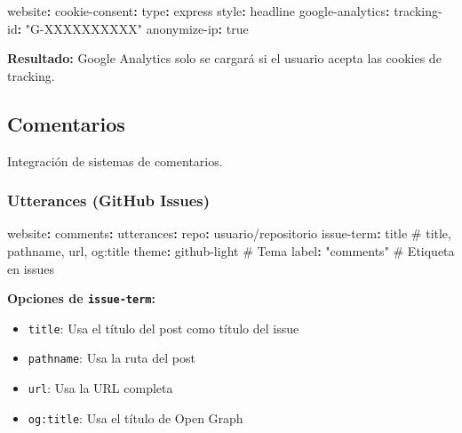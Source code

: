 \documentclass[
  doc,
  floatsintext,
  longtable,
  a4paper,
  nolmodern,
  notxfonts,
  notimes,
  12pt,
  colorlinks=true,linkcolor=blue,citecolor=blue,urlcolor=blue]{apa7}
\newenvironment{Shaded}{\begin{snugshade}}{\end{snugshade}}
\newcommand{\AttributeTok}[1]{\textcolor[rgb]{0.40,0.45,0.13}{#1}}
\newcommand{\CharTok}[1]{\textcolor[rgb]{0.13,0.47,0.30}{#1}}
\newcommand{\CommentTok}[1]{\textcolor[rgb]{0.37,0.37,0.37}{#1}}
\newcommand{\FunctionTok}[1]{\textcolor[rgb]{0.28,0.35,0.67}{#1}}
\newcommand{\KeywordTok}[1]{\textcolor[rgb]{0.00,0.23,0.31}{\textbf{#1}}}
\newcommand{\StringTok}[1]{\textcolor[rgb]{0.13,0.47,0.30}{#1}}
\providecommand{\tightlist}{%
  \setlength{\itemsep}{0pt}\setlength{\parskip}{0pt}}
\begin{document}
\begin{Shaded}
\begin{Highlighting}[]
\FunctionTok{website}\KeywordTok{:}
\AttributeTok{  }\FunctionTok{cookie{-}consent}\KeywordTok{:}
\AttributeTok{    }\FunctionTok{type}\KeywordTok{:}\AttributeTok{ express}
\AttributeTok{    }\FunctionTok{style}\KeywordTok{:}\AttributeTok{ headline}
\AttributeTok{    }
\AttributeTok{  }\FunctionTok{google{-}analytics}\KeywordTok{:}
\AttributeTok{    }\FunctionTok{tracking{-}id}\KeywordTok{:}\AttributeTok{ }\StringTok{"G{-}XXXXXXXXXX"}
\AttributeTok{    }\FunctionTok{anonymize{-}ip}\KeywordTok{:}\AttributeTok{ }\CharTok{true}
\end{Highlighting}
\end{Shaded}

\textbf{Resultado:} Google Analytics solo se cargará si el usuario
acepta las cookies de tracking.

\subsection{Comentarios}\label{comentarios}

Integración de sistemas de comentarios.

\subsubsection{Utterances (GitHub
Issues)}\label{utterances-github-issues}

\begin{Shaded}
\begin{Highlighting}[]
\FunctionTok{website}\KeywordTok{:}
\AttributeTok{  }\FunctionTok{comments}\KeywordTok{:}
\AttributeTok{    }\FunctionTok{utterances}\KeywordTok{:}
\AttributeTok{      }\FunctionTok{repo}\KeywordTok{:}\AttributeTok{ usuario/repositorio}
\AttributeTok{      }\FunctionTok{issue{-}term}\KeywordTok{:}\AttributeTok{ title}\CommentTok{              \# title, pathname, url, og:title}
\AttributeTok{      }\FunctionTok{theme}\KeywordTok{:}\AttributeTok{ github{-}light}\CommentTok{            \# Tema}
\AttributeTok{      }\FunctionTok{label}\KeywordTok{:}\AttributeTok{ }\StringTok{"comments"}\CommentTok{              \# Etiqueta en issues}
\end{Highlighting}
\end{Shaded}

\textbf{Opciones de \texttt{issue-term}:}

\begin{itemize}
\tightlist
\item
  \texttt{title}: Usa el título del post como título del issue
\item
  \texttt{pathname}: Usa la ruta del post
\item
  \texttt{url}: Usa la URL completa
\item
  \texttt{og:title}: Usa el título de Open Graph
\end{itemize}
\end{document}
